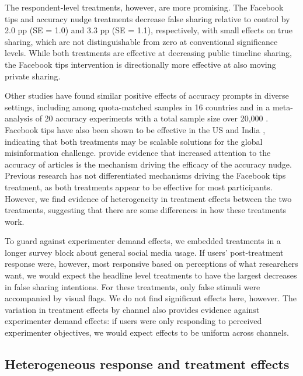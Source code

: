 \documentclass[letterpaper, 12pt, parskip=full,DIV=10]{scrartcl}
\begin{document}
The respondent-level treatments, however, are more promising. The Facebook tips and accuracy nudge treatments decrease false sharing relative to control by 2.0 pp (SE = 1.0) and 3.3 pp (SE = 1.1), respectively, with small effects on true sharing, which are not distinguishable from zero at conventional significance levels. While both treatments are effective at decreasing public timeline sharing, the Facebook tips intervention is directionally more effective at also moving private sharing. 

Other studies have found similar positive effects of accuracy prompts in diverse settings, including among quota-matched samples in 16 countries \citep{arechar2022understanding} and in a meta-analysis of 20 accuracy experiments with a total sample size over 20,000 \citep{pennycook2022accuracy}. Facebook tips have also been shown to be effective in the US and India \citep{guessetal2020digital}, indicating that both treatments may be scalable solutions for the global misinformation challenge. \citet{pennycook2021shifting} provide evidence that increased attention to the accuracy of articles is the mechanism driving the efficacy of the accuracy nudge. Previous research has not differentiated mechanisms driving the Facebook tips treatment, as both treatments appear to be effective for most participants. However, we find evidence of heterogeneity in treatment effects between the two treatments, suggesting that there are some differences in how these treatments work. 

To guard against experimenter demand effects, we embedded treatments in a longer survey block about general social media usage. If users' post-treatment response were, however, most responsive based on perceptions of what researchers want, we would expect the headline level treatments to have the largest decreases in false sharing intentions. For these treatments, only false stimuli were accompanied by visual flags. We do not find significant effects here, however. The variation in treatment effects by channel also provides evidence against experimenter demand effects: if users were only responding to perceived experimenter objectives, we would expect effects to be uniform across channels. %


\subsection{Heterogeneous response and treatment effects}
\end{document}
